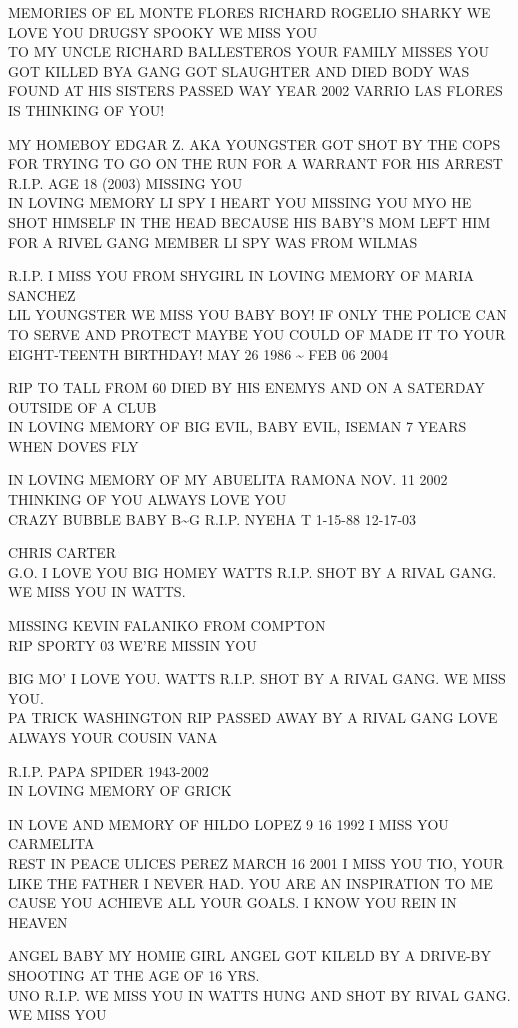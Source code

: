\documentclass[10pt,letterpaper]{article}
\begin{document}
MEMORIES OF EL MONTE FLORES RICHARD ROGELIO SHARKY WE LOVE YOU DRUGSY SPOOKY WE MISS YOU\\
TO MY UNCLE RICHARD BALLESTEROS YOUR FAMILY MISSES YOU GOT KILLED BYA GANG GOT SLAUGHTER AND DIED BODY WAS FOUND AT HIS SISTERS PASSED WAY YEAR 2002 VARRIO LAS FLORES IS THINKING OF YOU!

MY HOMEBOY EDGAR Z. AKA YOUNGSTER GOT SHOT BY THE COPS FOR TRYING TO GO ON THE RUN FOR A WARRANT FOR HIS ARREST R.I.P. AGE 18 (2003) MISSING YOU\\
IN LOVING MEMORY LI SPY I HEART YOU MISSING YOU MYO HE SHOT HIMSELF IN THE HEAD BECAUSE HIS BABY'S MOM LEFT HIM FOR A RIVEL GANG MEMBER LI SPY WAS FROM WILMAS

R.I.P. I MISS YOU FROM SHYGIRL IN LOVING MEMORY OF MARIA SANCHEZ\\
LIL YOUNGSTER WE MISS YOU BABY BOY!  IF ONLY THE POLICE CAN TO SERVE AND PROTECT MAYBE YOU COULD OF MADE IT TO YOUR EIGHT{-}TEENTH BIRTHDAY!  MAY 26 1986 \textasciitilde{} FEB 06 2004

RIP TO TALL FROM 60 DIED BY HIS ENEMYS AND ON A SATERDAY OUTSIDE OF A CLUB\\
IN LOVING MEMORY OF BIG EVIL, BABY EVIL, ISEMAN 7 YEARS WHEN DOVES FLY

IN LOVING MEMORY OF MY ABUELITA RAMONA NOV. 11 2002 THINKING OF YOU ALWAYS LOVE YOU\\
CRAZY BUBBLE BABY B\textasciitilde{}G R.I.P. NYEHA T 1{-}15{-}88 12{-}17{-}03

CHRIS CARTER\\
G.O. I LOVE YOU BIG HOMEY WATTS R.I.P.  SHOT BY A RIVAL GANG.  WE MISS YOU IN WATTS.

MISSING KEVIN FALANIKO FROM COMPTON\\
RIP SPORTY 03 WE'RE MISSIN YOU

BIG MO' I LOVE YOU. WATTS R.I.P. SHOT BY A RIVAL GANG.  WE MISS YOU.\\
PA TRICK WASHINGTON RIP PASSED AWAY BY A RIVAL GANG LOVE ALWAYS YOUR COUSIN VANA

R.I.P. PAPA SPIDER 1943{-}2002\\
IN LOVING MEMORY OF GRICK

IN LOVE AND MEMORY OF HILDO LOPEZ 9 16 1992 I MISS YOU CARMELITA\\
REST IN PEACE ULICES PEREZ MARCH 16 2001 I MISS YOU TIO, YOUR LIKE THE FATHER I NEVER HAD.  YOU ARE AN INSPIRATION TO ME CAUSE YOU ACHIEVE ALL YOUR GOALS.  I KNOW YOU REIN IN HEAVEN

ANGEL BABY MY HOMIE GIRL ANGEL GOT KILELD BY A DRIVE{-}BY SHOOTING AT THE AGE OF 16 YRS.\\
UNO R.I.P.  WE MISS YOU IN WATTS HUNG AND SHOT BY RIVAL GANG.  WE MISS YOU
\end{document}
